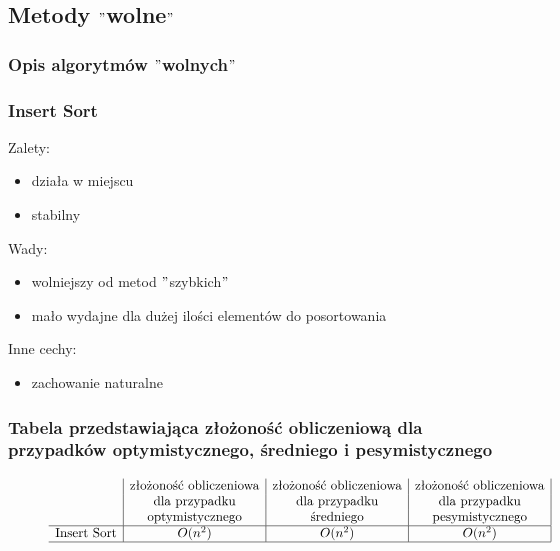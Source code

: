 \documentclass[polish,polish,a4paper]{article}
\begin{document}
\begin{spacing}{1.5}
	\subsection{Metody $ "$wolne$" $}
	\subsubsection{Opis algorytmów $"$wolnych$"$}
	\subsubsection*{Insert Sort}
	Zalety:
	\begin{itemize}
		\item działa w miejscu
		\item stabilny 
	\end{itemize}
	Wady:
	\begin{itemize}
		\item wolniejszy od metod $ " $szybkich$ " $
		\item mało wydajne dla dużej ilości elementów do posortowania
	\end{itemize}
	Inne cechy:
	\begin{itemize}
		\item zachowanie naturalne
	\end{itemize}
	
				\subsubsection*{Tabela przedstawiająca złożoność obliczeniową dla przypadków optymistycznego, średniego i pesymistycznego} 
	
	\begin{figure}[H]
		\begin{equation*}
		\begin{array}{l|c|c|c|}

		&$złożoność obliczeniowa$&$złożoność obliczeniowa$&$złożoność obliczeniowa$\\
		&$dla przypadku$&$dla przypadku$&$dla przypadku$\\
		&$optymistycznego$&$średniego$&$pesymistycznego$\\
		\hline
		$Insert Sort$&O(n^2)&O(n^2)&O(n^2)\\
		\hline
		\end{array}
		\end{equation*}
	\end{figure}
		

\end{spacing}
\end{document}
